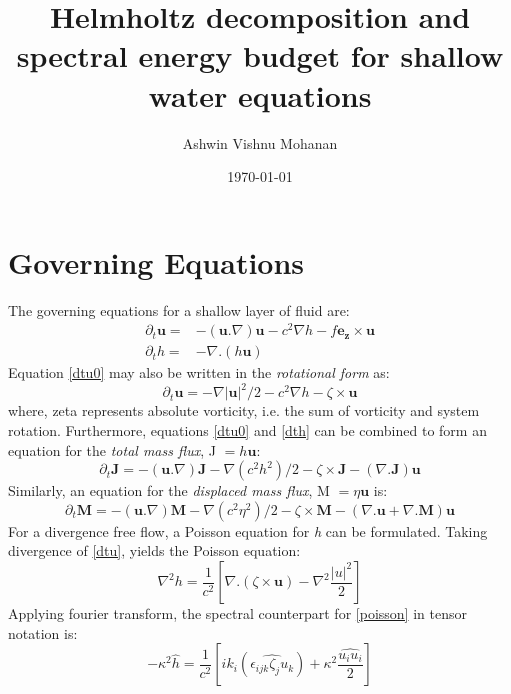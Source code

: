 \documentclass[a4paper,12pt]{paper}
\title{Helmholtz decomposition and spectral energy budget for shallow 
water equations}
\author{\small Ashwin Vishnu Mohanan}
\date{\tiny \today}
\begin{document}
\maketitle

\printglossaries

\section{Governing Equations}

The governing equations for a shallow layer of fluid are:
\begin{align}
  \partial_t \mathbf u 
      = &- (\mathbf{u}.\nabla) \mathbf{u} - c^2 \nabla h - f\mathbf{e_z} \times 
\mathbf u \label{dtu0} \\
  \partial_t h 
      =& - \nabla. (h \mathbf u) \label{dth}
\end{align}
Equation \eqref{dtu0} may also be written in the \textit{rotational form} as:
\begin{equation}
 \label{dtu}
 \partial_t \mathbf u 
 = - \nabla |\mathbf u|^2/2 - c^2 \nabla h - \zeta \times \mathbf u
\end{equation}
where, \gls{zeta}
represents absolute vorticity, i.e. the sum of vorticity and system rotation.
Furthermore, equations \eqref{dtu0} and \eqref{dth} can be combined to form an 
equation for the \textit{total mass flux}, \gls{J} $= h\mathbf{u}$:
\begin{equation}
  \label{dtJ}
 \partial_t \mathbf J = -(\mathbf{u}.\nabla)\mathbf{J} - \nabla(c^2h^2)/2 -
\zeta \times \mathbf J - (\nabla. \mathbf J)\mathbf u
\end{equation}
Similarly, an equation for the \textit{displaced mass flux}, \gls{M} $ = 
\eta\mathbf{u}$ is:
\begin{equation}
  \label{dtM}
 \partial_t \mathbf M = -(\mathbf{u}.\nabla)\mathbf{M} - \nabla(c^2\eta^2)/2 - 
\zeta \times \mathbf M - (\nabla.\mathbf{u} + \nabla.\mathbf{M})\mathbf u
\end{equation}
For a divergence free flow, a Poisson equation for \emph{h} can be formulated.
Taking divergence of \eqref{dtu},
yields the Poisson equation:
\begin{equation}
  \label{poisson}
  \nabla^2 h = \frac{1}{c^2} \left[ \nabla.(\zeta \times \mathbf u )
	      - \nabla^2 \frac{|u|^2}{2} \right]
\end{equation}
Applying fourier transform, the spectral counterpart for \eqref{poisson} in 
tensor notation is:
\begin{equation}
\label{poisson_fft}
  -\kappa^2 \hat{h} = \frac{1}{c^2} \left[ ik_i (\widehat{\epsilon_{ijk} \zeta_j 
u_k})
	      + \kappa^2 \frac{\widehat{u_i u_i}}{2} \right]
\end{equation}
\end{document}
